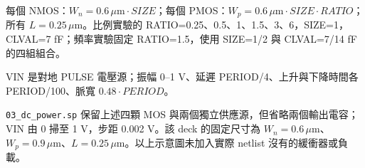 每個 NMOS：$W_n=0.6\,\mu\mathrm m\cdot SIZE$；每個 PMOS：$W_p=0.6\,\mu\mathrm m\cdot SIZE\cdot RATIO$；所有 $L=0.25\,\mu$m。比例實驗的 RATIO=0.25、0.5、1、1.5、3、6，SIZE=1，CLVAL=7 fF；頻率實驗固定 RATIO=1.5，使用 SIZE=1/2 與 CLVAL=7/14 fF 的四組組合。

VIN 是對地 PULSE 電壓源；振幅 0--1 V、延遲 PERIOD/4、上升與下降時間各 PERIOD/100、脈寬 $0.48\cdot PERIOD$。

\nolinkurl{03_dc_power.sp} 保留上述四顆 MOS 與兩個獨立供應源，但省略兩個輸出電容；VIN 由 0 掃至 1 V，步距 0.002 V。該 deck 的固定尺寸為 $W_n=0.6\,\mu$m、$W_p=0.9\,\mu$m、$L=0.25\,\mu$m。以上示意圖未加入實際 netlist 沒有的緩衝器或負載。

